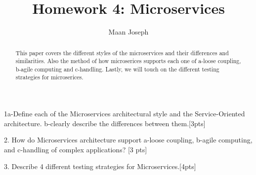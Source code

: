 \documentclass{IEEEtran}
\title{Homework 4: Microservices}
\author{Maan Joseph}
\begin{document}
	\maketitle
	\begin{abstract}
		This paper covers the different styles of the microservices and their differences and similarities. Also the method of how microserices supports each one of a-loose coupling, b-agile computing and c-handling. Lastly, we will touch on the different testing strategies for microserices.   
	\end{abstract}

\cite{ibmred}


	1a-Define each of the Microservices architectural style and the Service-Oriented architecture. b-clearly describe the differences between them.[3pts]

2. How do Microservices architecture support a-loose coupling, b-agile computing, and c-handling of complex applications? [3 pts]

3. Describe 4 different testing strategies for Microservices.[4pts]


	\newpage
	
	
\end{document}
